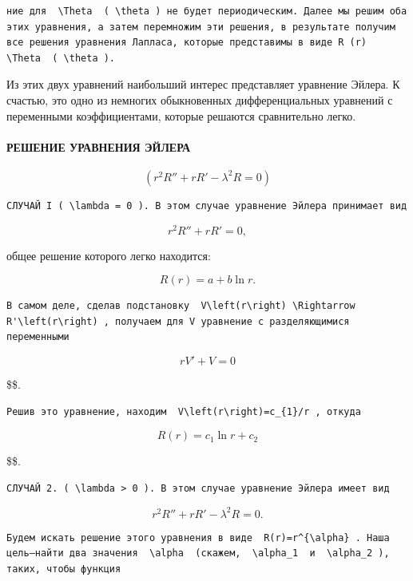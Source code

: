 \documentclass[
  ukrainian,
]{article}
\begin{document}
\begin{verbatim}
ние для  \Theta  ( \theta ) не будет периодическим. Далее мы решим оба этих уравнения, а затем перемножим эти решения, в результате получим все решения уравнения Лапласа, которые представимы в виде R (r)  \Theta  ( \theta ).
\end{verbatim}

Из этих двух уравнений наибольший интерес представляет уравнение Эйлера.
К счастью, это одно из немногих обыкновенных дифференциальных уравнений
с переменными коэффициентами, которые решаются сравнительно легко.

\paragraph{РЕШЕНИЕ УРАВНЕНИЯ
ЭЙЛЕРА}\label{ux440ux435ux448ux435ux43dux438ux435-ux443ux440ux430ux432ux43dux435ux43dux438ux44f-ux44dux439ux43bux435ux440ux430}

\[
(r^2R'' + rR' - \lambda^2R = 0)
\]

\begin{verbatim}
СЛУЧАЙ I ( \lambda = 0 ). В этом случае уравнение Эйлера принимает вид
\end{verbatim}

\[
r^2R'' + rR' = 0,
\]

общее решение которого легко находится:

\[
R(r) = a + b \ln r.
\]

\begin{verbatim}
В самом деле, сделав подстановку  V\left(r\right) \Rightarrow R'\left(r\right) , получаем для V уравнение с разделяющимися переменными
\end{verbatim}

\[
rV' + V = 0
\]

\$\$.

\begin{verbatim}
Решив это уравнение, находим  V\left(r\right)=c_{1}/r , откуда
\end{verbatim}

\[
R(r) = c_1 \ln r + c_2
\]

\$\$.

\begin{verbatim}
СЛУЧАЙ 2. ( \lambda > 0 ). В этом случае уравнение Эйлера имеет вид
\end{verbatim}

\[
r^2R'' + rR' - \lambda^2R = 0.
\]

\begin{verbatim}
Будем искать решение этого уравнения в виде  R(r)=r^{\alpha} . Наша цель—найти два значения  \alpha  (скажем,  \alpha_1  и  \alpha_2 ), таких, чтобы функция
\end{verbatim}
\end{document}
